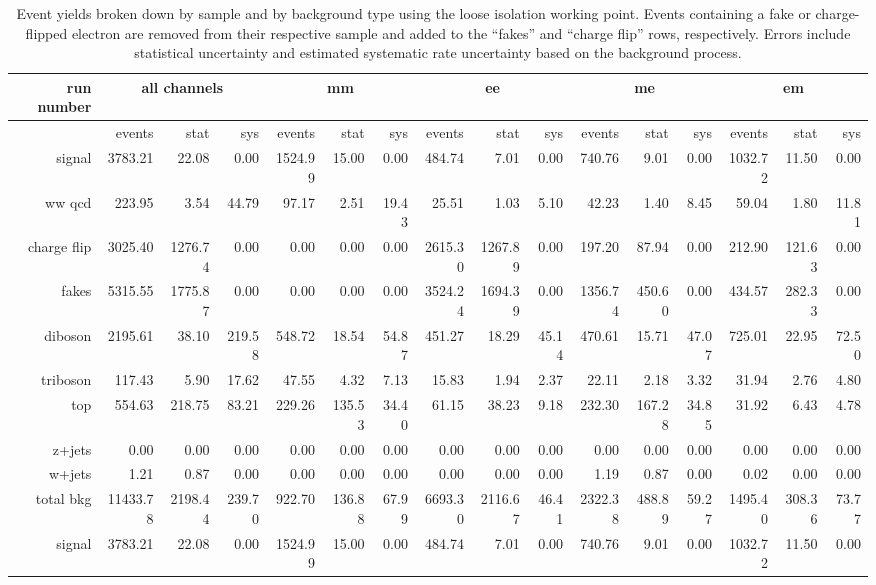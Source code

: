 \begin{sidewaystable}[!htbp]
  {\scriptsize
    \begin{tabular}{r|rrr|rrr|rrr|rrr|rrr}
      run number&\multicolumn{3}{c|}{all channels}&\multicolumn{3}{c|}{mm}&\multicolumn{3}{c|}{ee}&\multicolumn{3}{c|}{me}&\multicolumn{3}{c}{em}\\
      \hline
      &events&stat&sys&events&stat&sys&events&stat&sys&events&stat&sys&events&stat&sys\\
      \hline\hline
      signal&3783.21&22.08&0.00&1524.99&15.00&0.00&484.74&7.01&0.00&740.76&9.01&0.00&1032.72&11.50&0.00\\
      
      ww qcd&223.95&3.54&44.79&97.17&2.51&19.43&25.51&1.03&5.10&42.23&1.40&8.45&59.04&1.80&11.81\\
      
      charge flip&3025.40&1276.74&0.00&0.00&0.00&0.00&2615.30&1267.89&0.00&197.20&87.94&0.00&212.90&121.63&0.00\\
      
      fakes&5315.55&1775.87&0.00&0.00&0.00&0.00&3524.24&1694.39&0.00&1356.74&450.60&0.00&434.57&282.33&0.00\\
      
      diboson&2195.61&38.10&219.58&548.72&18.54&54.87&451.27&18.29&45.14&470.61&15.71&47.07&725.01&22.95&72.50\\
      
      triboson&117.43&5.90&17.62&47.55&4.32&7.13&15.83&1.94&2.37&22.11&2.18&3.32&31.94&2.76&4.80\\
      
      top&554.63&218.75&83.21&229.26&135.53&34.40&61.15&38.23&9.18&232.30&167.28&34.85&31.92&6.43&4.78\\
      
      z+jets&0.00&0.00&0.00&0.00&0.00&0.00&0.00&0.00&0.00&0.00&0.00&0.00&0.00&0.00&0.00\\
      
      w+jets&1.21&0.87&0.00&0.00&0.00&0.00&0.00&0.00&0.00&1.19&0.87&0.00&0.02&0.00&0.00\\
      \hline
      total bkg&11433.78&2198.44&239.70&922.70&136.88&67.99&6693.30&2116.67&46.41&2322.38&488.89&59.27&1495.40&308.36&73.77\\
      
      signal&3783.21&22.08&0.00&1524.99&15.00&0.00&484.74&7.01&0.00&740.76&9.01&0.00&1032.72&11.50&0.00\\
      \hline\hline
    \end{tabular}
  }
  \caption{Event yields broken down by sample and by background type using the loose isolation working point.  Events containing a fake or charge-flipped electron are removed from their respective sample and added to the ``fakes'' and ``charge flip'' rows, respectively.  Errors include statistical uncertainty and estimated systematic rate uncertainty based on the background process.}
  \label{tab:EY_loose}
\end{sidewaystable}
